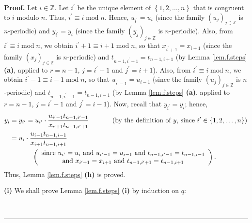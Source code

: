 \documentclass[numbers=enddot,12pt,final,onecolumn,notitlepage]{scrartcl}%
\theoremstyle{definition}
\newenvironment{proof}[1][Proof]{\noindent\textbf{#1.} }{\ \rule{0.5em}{0.5em}}
\newenvironment{verlong}{}{}
\begin{document}
\begin{proof}
\begin{verlong}
Let $i\in\mathbb{Z}$. Let $i^{\prime}$ be the unique element of $\left\{
1,2,\ldots,n\right\}  $ that is congruent to $i$ modulo $n$. Thus, $i^{\prime
}\equiv i\operatorname{mod}n$. Hence, $u_{i^{\prime}}=u_{i}$ (since the family
$\left(  u_{j}\right)  _{j\in\mathbb{Z}}$ is $n$-periodic) and $y_{i^{\prime}%
}=y_{i}$ (since the family $\left(  y_{j}\right)  _{j\in\mathbb{Z}}$ is
$n$-periodic). Also, from $i^{\prime}\equiv i\operatorname{mod}n$, we obtain
$i^{\prime}+1\equiv i+1\operatorname{mod}n$, so that $x_{i^{\prime}+1}%
=x_{i+1}$ (since the family $\left(  x_{j}\right)  _{j\in\mathbb{Z}}$ is
$n$-periodic) and $t_{n-1,i^{\prime}+1}=t_{n-1,i+1}$ (by Lemma
\ref{lem.f.steps} \textbf{(a)}, applied to $r=n-1$, $j=i^{\prime}+1$ and
$j^{\prime}=i+1$). Also, from $i^{\prime}\equiv i\operatorname{mod}n$, we
obtain $i^{\prime}-1\equiv i-1\operatorname{mod}n$, so that $u_{i^{\prime}%
-1}=u_{i-1}$ (since the family $\left(  u_{j}\right)  _{j\in\mathbb{Z}}$ is
$n$-periodic) and $t_{n-1,i^{\prime}-1}=t_{n-1,i-1}$ (by Lemma
\ref{lem.f.steps} \textbf{(a)}, applied to $r=n-1$, $j=i^{\prime}-1$ and
$j^{\prime}=i-1$). Now, recall that $y_{i^{\prime}}=y_{i}$; hence,%
\begin{align*}
y_{i}  &  =y_{i^{\prime}}=u_{i^{\prime}}\cdot\dfrac{u_{i^{\prime}%
-1}t_{n-1,i^{\prime}-1}}{x_{i^{\prime}+1}t_{n-1,i^{\prime}+1}}%
\ \ \ \ \ \ \ \ \ \ \left(  \text{by the definition of }y\text{, since
}i^{\prime}\in\left\{  1,2,\ldots,n\right\}  \right) \\
&  =u_{i}\cdot\dfrac{u_{i-1}t_{n-1,i-1}}{x_{i+1}t_{n-1,i+1}}\\
&  \ \ \ \ \ \ \ \ \ \ \left(
\begin{array}
[c]{c}%
\text{since }u_{i^{\prime}}=u_{i}\text{ and }u_{i^{\prime}-1}=u_{i-1}\text{
and }t_{n-1,i^{\prime}-1}=t_{n-1,i-1}\\
\text{and }x_{i^{\prime}+1}=x_{i+1}\text{ and }t_{n-1,i^{\prime}%
+1}=t_{n-1,i+1}%
\end{array}
\right)  .
\end{align*}
Thus, Lemma \ref{lem.f.steps} \textbf{(h)} is proved.
\end{verlong}

\textbf{(i)} We shall prove Lemma \ref{lem.f.steps} \textbf{(i)} by induction
on $q$:


\end{proof}
\end{document}
